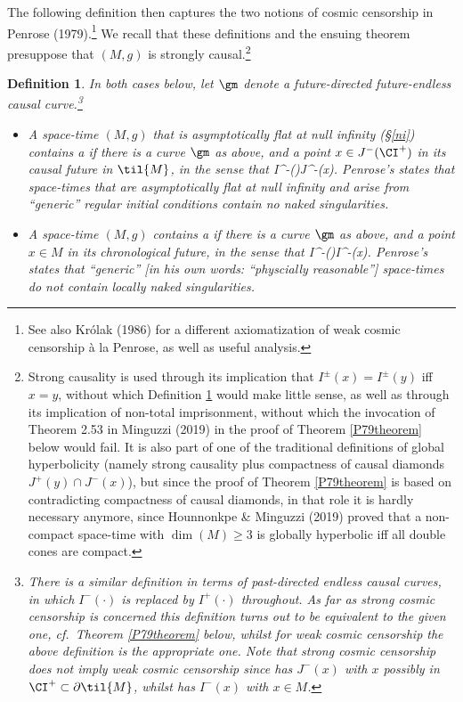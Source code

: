 \documentclass[12pt]{article}
\newcommand{\p}{\partial}
\newtheorem{definition}[theorem]{Definition}
\begin{document}
  The following definition then captures the two notions of cosmic censorship in Penrose (1979).\footnote{See also  Kr\'{o}lak (1986) for a  different  axiomatization of weak cosmic censorship \`{a} la Penrose, as well as useful analysis.}
   We recall that these definitions and the ensuing theorem presuppose that $(M,g)$ is strongly causal.\footnote{Strong causality is used through its implication that $I^{\pm}(x)=I^{\pm}(y)$ iff $x=y$, without which Definition \ref{CSdef1} would make little sense, as well as through its implication of non-total imprisonment, without which the invocation of Theorem 2.53 in Minguzzi (2019) in the proof of Theorem \ref{P79theorem} below would fail. It is also part of one of the traditional definitions of global hyperbolicity (namely strong causality plus compactness of causal diamonds $J^+(y)\cap J^-(x)$), but since the proof of  Theorem \ref{P79theorem} is based on contradicting compactness of causal diamonds, in that role it is hardly necessary anymore, since Hounnonkpe \& Minguzzi (2019) proved that  a non-compact space-time with $\dim(M)\geq 3$ is globally hyperbolic iff all  double cones are compact.}
   \begin{definition}\label{CSdef1}
In both cases below, let $\gm$ denote a future-directed future-endless causal curve.\footnote{There is a similar definition in terms of  \emph{past-directed} endless causal curves, in which $I^-(\cdot)$ is replaced by  $I^+(\cdot)$ throughout. As far as strong cosmic censorship is concerned this definition turns out to be equivalent to the given one, cf.\ Theorem \ref{P79theorem} below, whilst for  weak cosmic censorship the above definition is the appropriate one. Note that strong cosmic censorship does not imply weak cosmic censorship since  has $J^-(x)$ with $x$ possibly in $\CI^+\subset\p\til{M}$, whilst  has $I^-(x)$ with $x\in M$.
 } 
  \begin{itemize}
  \item  A space-time $(M,g)$ that is asymptotically flat at null infinity (\S\ref{ni}) contains a  if  there is a curve $\gm$ as above, and a point $x\in J^-(\CI^+)$ in its causal future in $\til{M}$,  in the sense that 
  \beq
  I^-(\gm)\subset J^-(x).  \label{Isubset0}
  \eeq
   Penrose's  states that  space-times that are asymptotically flat at null infinity and arise from  ``ge\-ne\-ric''  regular initial conditions contain no naked singularities.
\item A space-time $(M,g)$  contains a  if there is a curve $\gm$ as above, and a point $x\in M$  in its chronological future, in the sense that
 \beq
I^-(\gm)\subset I^-(x). \label{Isubset}
\eeq
 Penrose's  states that ``ge\-ne\-ric'' [in his own words: ``physcially reasonable''] space-times do not contain locally naked singularities.
\end{itemize}
   \end{definition}
\end{document}
